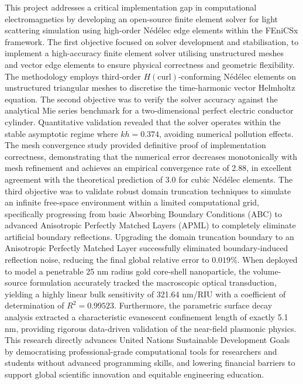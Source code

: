 \documentclass[12pt, a4paper]{report}
\begin{document}
\begin{doublespacing}
This project addresses a critical implementation gap in computational electromagnetics by developing an open-source finite element solver for light scattering simulation using high-order N\'ed\'elec edge elements within the FEniCSx framework. The first objective focused on solver development and stabilisation, to implement a high-accuracy finite element solver utilising unstructured meshes and vector edge elements to ensure physical correctness and geometric flexibility. The methodology employs third-order $H(\text{curl})$-conforming N\'ed\'elec elements on unstructured triangular meshes to discretise the time-harmonic vector Helmholtz equation. The second objective was to verify the solver accuracy against the analytical Mie series benchmark for a two-dimensional perfect electric conductor cylinder. Quantitative validation revealed that the solver operates within the stable asymptotic regime where $kh = 0.374$, avoiding numerical pollution effects. The mesh convergence study provided definitive proof of implementation correctness, demonstrating that the numerical error decreases monotonically with mesh refinement and achieves an empirical convergence rate of 2.88, in excellent agreement with the theoretical prediction of 3.0 for cubic N\'ed\'elec elements. The third objective was to validate robust domain truncation techniques to simulate an infinite free-space environment within a limited computational grid, specifically progressing from basic Absorbing Boundary Conditions (ABC) to advanced Anisotropic Perfectly Matched Layers (APML) to completely eliminate artificial boundary reflections. Upgrading the domain truncation boundary to an Anisotropic Perfectly Matched Layer successfully eliminated boundary-induced reflection noise, reducing the final global relative error to $0.019\%$. When deployed to model a penetrable 25 nm radius gold core-shell nanoparticle, the volume-source formulation accurately tracked the macroscopic optical transduction, yielding a highly linear bulk sensitivity of 321.64 nm/RIU with a coefficient of determination of $R^2 = 0.99523$. Furthermore, the parametric surface decay analysis extracted a characteristic evanescent confinement length of exactly 5.1 nm, providing rigorous data-driven validation of the near-field plasmonic physics. This research directly advances United Nations Sustainable Development Goals by democratising professional-grade computational tools for researchers and students without advanced programming skills, and lowering financial barriers to support global scientific innovation and equitable engineering education.
\end{doublespacing}
\end{document}

